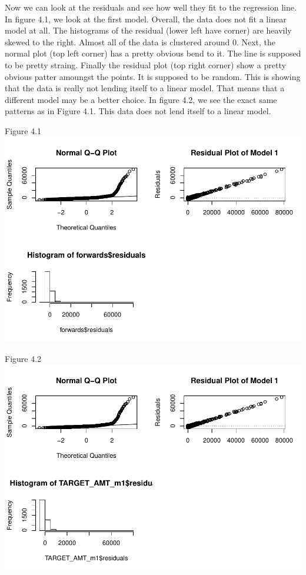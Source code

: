 \documentclass[]{article}
\begin{document}
Now we can look at the residuals and see how well they fit to the
regression line. In figure 4.1, we look at the first model. Overall, the
data does not fit a linear model at all. The histograms of the residual
(lower left have corner) are heavily skewed to the right. Almost all of
the data is clustered around 0. Next, the normal plot (top left corner)
has a pretty obvious bend to it. The line is supposed to be pretty
straing. Finally the residual plot (top right corner) show a pretty
obvious patter amoungst the points. It is supposed to be random. This is
showing that the data is really not lending itself to a linear model.
That means that a different model may be a better choice. In figure 4.2,
we see the exact same patterns as in Figure 4.1. This data does not lend
itself to a linear model.

Figure 4.1
\includegraphics{DATA621-Homework-4_files/figure-latex/unnamed-chunk-29-1.pdf}

Figure 4.2
\includegraphics{DATA621-Homework-4_files/figure-latex/unnamed-chunk-30-1.pdf}
\end{document}
